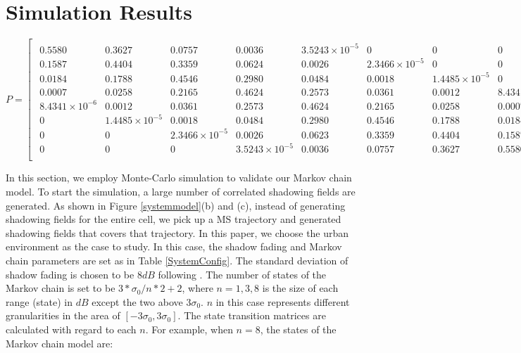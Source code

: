\section{Simulation Results}
\label{sec:simulation}
\begin{table}
\begin{equation}
P=\begin{bmatrix}
\begin{smallmatrix}
0.5580 & 0.3627 & 0.0757 & 0.0036 & 3.5243\times10^{-5} & 0 & 0 & 0 \\
0.1587 & 0.4404 & 0.3359 & 0.0624 & 0.0026 & 2.3466\times10^{-5} & 0 & 0 \\
0.0184 & 0.1788 & 0.4546 & 0.2980 & 0.0484 & 0.0018 & 1.4485\times10^{-5} & 0 \\
0.0007 & 0.0258 & 0.2165 & 0.4624 & 0.2573 & 0.0361 & 0.0012 & 8.4341\times10^{-6} \\
8.4341\times10^{-6} & 0.0012 & 0.0361 & 0.2573 & 0.4624 & 0.2165 & 0.0258 & 0.0007 \\
0 & 1.4485\times10^{-5} & 0.0018 & 0.0484 & 0.2980 & 0.4546 & 0.1788 & 0.0184 \\
0 & 0 & 2.3466\times10^{-5} & 0.0026 & 0.0623 & 0.3359 & 0.4404 & 0.1587 \\
0 & 0 & 0 & 3.5243\times10^{-5} & 0.0036 & 0.0757 & 0.3627 & 0.5580 \\
\end{smallmatrix}
\end{bmatrix}
\label{matrix}
\end{equation}
\end{table}
\par In this section, we employ Monte-Carlo simulation to validate our Markov chain model. To start the simulation, a large number of correlated shadowing fields are generated. As shown in Figure \ref{systemmodel}(b) and (c), instead of generating shadowing fields for the entire cell, we pick up a MS trajectory and generated shadowing fields that covers that trajectory. In this paper, we choose the urban environment as the case to study. In this case, the shadow fading and Markov chain parameters are set as in Table \ref{SystemConfig}. The standard deviation of shadow fading is chosen to be $8dB$ following \cite{szyszkowicz2010feasibility}. The number of states of the Markov chain is set to be $3*\sigma_{0}/n*2+2$, where $n=1,3,8$ is the size of each range (state) in $dB$ except the two above $3\sigma_{0}$. $n$ in this case represents different granularities in the area of $[-3\sigma_{0},3\sigma_{0}]$. The state transition matrices are calculated with regard to each $n$. For example, when $n=8$, the states of the Markov chain model are:

